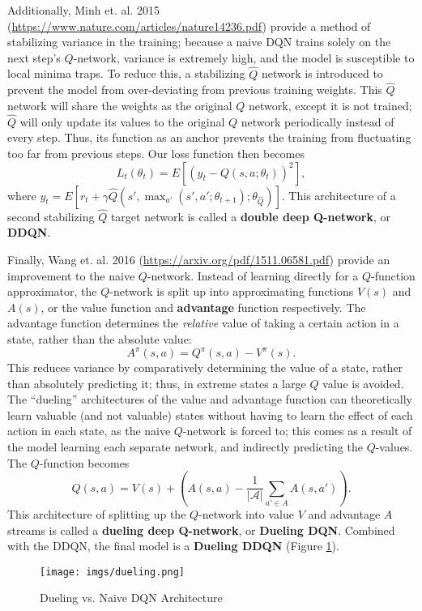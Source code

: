 \documentclass{article} %
\begin{document}
Additionally, Minh et. al. 2015 (\url{https://www.nature.com/articles/nature14236.pdf}) provide
a method of stabilizing variance in the training; because a naive DQN trains solely on the next
step's $Q$-network, variance is extremely high, and the model is susceptible to local minima traps.
To reduce this, a stabilizing $\hat{Q}$ network is introduced to prevent the model from
over-deviating from previous training weights. This $\hat{Q}$ network will share the weights as the
original $Q$ network, except it is not trained; $\hat{Q}$ will only update its values to the
original $Q$ network periodically instead of every step. Thus, its function as an anchor prevents
the training from fluctuating too far from previous steps. Our loss function then becomes \[
  L_t(\theta_t)=E[(y_t-Q(s,a;\theta_t))^2]
,\] where $y_t=E[r_t+\gamma \hat{Q}(s', \max_{a'}(s', a';\theta_{t+1}); \theta_{\hat{Q}})]$. This
architecture of a second stabilizing $\hat{Q}$ target network is called a \textbf{double deep
Q-network}, or \textbf{DDQN}. 

Finally, Wang et. al. 2016 (\url{https://arxiv.org/pdf/1511.06581.pdf}) provide an improvement to
the naive $Q$-network. Instead of learning directly for a $Q$-function approximator, the $Q$-network
is split up into approximating functions $V(s)$ and $A(s)$, or the value function and
\textbf{advantage} function respectively. The advantage function determines the \textit{relative}
value of taking a certain action in a state, rather than the absolute value: \[
  A^\pi(s, a)=Q^\pi(s, a)-V^\pi(s)
.\] This reduces variance by comparatively determining the value of a state, rather than absolutely
predicting it; thus, in extreme states a large $Q$ value is avoided. The ``dueling'' architectures
of the value and advantage function can theoretically learn valuable (and not valuable) states
without having to learn the effect of each action in each state, as the naive $Q$-network is forced
to; this comes as a result of the model learning each separate network, and indirectly predicting
the $Q$-values. The $Q$-function becomes \[
  Q(s, a)=V(s)+\left( A(s,a) - \frac{1}{\left| \mathcal{A} \right| }\sum_{a'\in A}A(s,a') \right) 
.\] This architecture of splitting up the $Q$-network into value $V$ and advantage $A$ streams is
called a \textbf{dueling deep Q-network}, or \textbf{Dueling DQN}. Combined with the DDQN, the final
model is a \textbf{Dueling DDQN} (Figure \ref{fig:imgs-dueling-png}).

\begin{figure}[htpb]
  \centering
  \texttt{[image: imgs/dueling.png]}
  \caption{Dueling vs. Naive DQN Architecture}
  \label{fig:imgs-dueling-png}
\end{figure}
\end{document}
